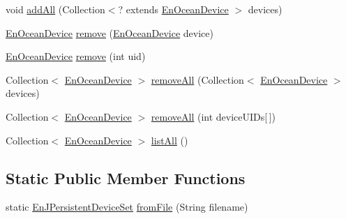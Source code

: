 \begin{DoxyCompactItemize}
\item 
void \hyperlink{classit_1_1polito_1_1elite_1_1enocean_1_1enj_1_1application_1_1devices_1_1_en_j_persistent_device_set_a09fb55c9d8f446e1847b8740d3193db8}{add\+All} (Collection$<$? extends \hyperlink{classit_1_1polito_1_1elite_1_1enocean_1_1enj_1_1model_1_1_en_ocean_device}{En\+Ocean\+Device} $>$ devices)
\item 
\hyperlink{classit_1_1polito_1_1elite_1_1enocean_1_1enj_1_1model_1_1_en_ocean_device}{En\+Ocean\+Device} \hyperlink{classit_1_1polito_1_1elite_1_1enocean_1_1enj_1_1application_1_1devices_1_1_en_j_persistent_device_set_a9f32f2e98193d3045a7ea3d4285dee16}{remove} (\hyperlink{classit_1_1polito_1_1elite_1_1enocean_1_1enj_1_1model_1_1_en_ocean_device}{En\+Ocean\+Device} device)
\item 
\hyperlink{classit_1_1polito_1_1elite_1_1enocean_1_1enj_1_1model_1_1_en_ocean_device}{En\+Ocean\+Device} \hyperlink{classit_1_1polito_1_1elite_1_1enocean_1_1enj_1_1application_1_1devices_1_1_en_j_persistent_device_set_a8064698a9f12b69f7bd648e1e62f37e7}{remove} (int uid)
\item 
Collection$<$ \hyperlink{classit_1_1polito_1_1elite_1_1enocean_1_1enj_1_1model_1_1_en_ocean_device}{En\+Ocean\+Device} $>$ \hyperlink{classit_1_1polito_1_1elite_1_1enocean_1_1enj_1_1application_1_1devices_1_1_en_j_persistent_device_set_a6344f14df38bf2f5081c9404f86ad124}{remove\+All} (Collection$<$ \hyperlink{classit_1_1polito_1_1elite_1_1enocean_1_1enj_1_1model_1_1_en_ocean_device}{En\+Ocean\+Device} $>$ devices)
\item 
Collection$<$ \hyperlink{classit_1_1polito_1_1elite_1_1enocean_1_1enj_1_1model_1_1_en_ocean_device}{En\+Ocean\+Device} $>$ \hyperlink{classit_1_1polito_1_1elite_1_1enocean_1_1enj_1_1application_1_1devices_1_1_en_j_persistent_device_set_a8fc946aebf19233b1df176d7a48bf9d4}{remove\+All} (int device\+U\+I\+Ds\mbox{[}$\,$\mbox{]})
\item 
Collection$<$ \hyperlink{classit_1_1polito_1_1elite_1_1enocean_1_1enj_1_1model_1_1_en_ocean_device}{En\+Ocean\+Device} $>$ \hyperlink{classit_1_1polito_1_1elite_1_1enocean_1_1enj_1_1application_1_1devices_1_1_en_j_persistent_device_set_a900dbd6f2f27f8d190250f72525cc1f6}{list\+All} ()
\end{DoxyCompactItemize}
\subsection*{Static Public Member Functions}
\begin{DoxyCompactItemize}
\item 
static \hyperlink{classit_1_1polito_1_1elite_1_1enocean_1_1enj_1_1application_1_1devices_1_1_en_j_persistent_device_set}{En\+J\+Persistent\+Device\+Set} \hyperlink{classit_1_1polito_1_1elite_1_1enocean_1_1enj_1_1application_1_1devices_1_1_en_j_persistent_device_set_a90909e32675ce6eb52fa631fbb477ef3}{from\+File} (String filename)
\end{DoxyCompactItemize}


